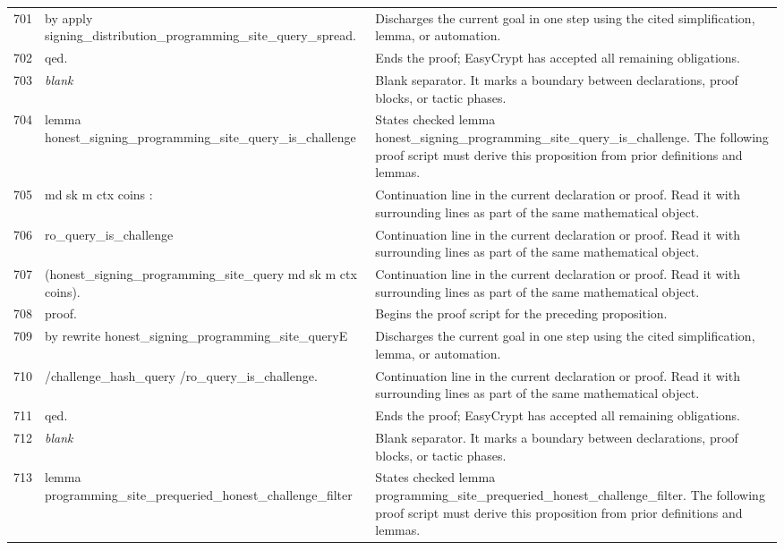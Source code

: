 \documentclass[10pt]{article}
\begin{document}
\begin{longtable}{r L{0.53\textwidth} L{0.37\textwidth}}
701 & {\ttfamily\scriptsize by apply signing\_distribution\_programming\_site\_query\_spread.} & Discharges the current goal in one step using the cited simplification, lemma, or automation. \\
702 & {\ttfamily\scriptsize qed.} & Ends the proof; EasyCrypt has accepted all remaining obligations. \\
703 & {\ttfamily\scriptsize \emph{blank}} & Blank separator.  It marks a boundary between declarations, proof blocks, or tactic phases. \\
704 & {\ttfamily\scriptsize lemma honest\_signing\_programming\_site\_query\_is\_challenge} & States checked lemma honest\_signing\_programming\_site\_query\_is\_challenge.  The following proof script must derive this proposition from prior definitions and lemmas. \\
705 & {\ttfamily\scriptsize   md sk m ctx coins :} & Continuation line in the current declaration or proof.  Read it with surrounding lines as part of the same mathematical object. \\
706 & {\ttfamily\scriptsize   ro\_query\_is\_challenge} & Continuation line in the current declaration or proof.  Read it with surrounding lines as part of the same mathematical object. \\
707 & {\ttfamily\scriptsize     (honest\_signing\_programming\_site\_query md sk m ctx coins).} & Continuation line in the current declaration or proof.  Read it with surrounding lines as part of the same mathematical object. \\
708 & {\ttfamily\scriptsize proof.} & Begins the proof script for the preceding proposition. \\
709 & {\ttfamily\scriptsize by rewrite honest\_signing\_programming\_site\_queryE} & Discharges the current goal in one step using the cited simplification, lemma, or automation. \\
710 & {\ttfamily\scriptsize            /challenge\_hash\_query /ro\_query\_is\_challenge.} & Continuation line in the current declaration or proof.  Read it with surrounding lines as part of the same mathematical object. \\
711 & {\ttfamily\scriptsize qed.} & Ends the proof; EasyCrypt has accepted all remaining obligations. \\
712 & {\ttfamily\scriptsize \emph{blank}} & Blank separator.  It marks a boundary between declarations, proof blocks, or tactic phases. \\
713 & {\ttfamily\scriptsize lemma programming\_site\_prequeried\_honest\_challenge\_filter} & States checked lemma programming\_site\_prequeried\_honest\_challenge\_filter.  The following proof script must derive this proposition from prior definitions and lemmas. \\

\end{longtable}
\end{document}
